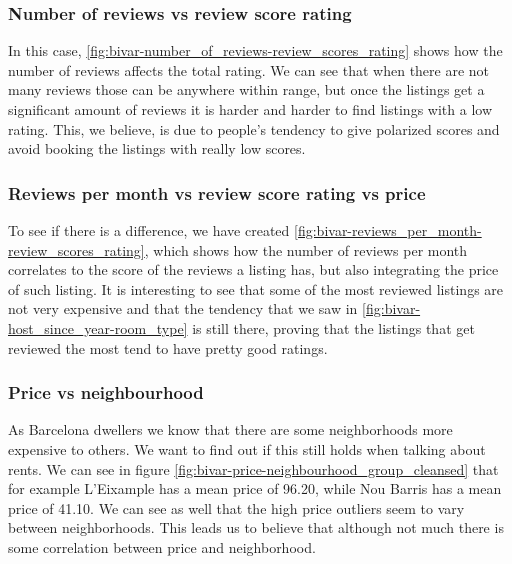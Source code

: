 \pagebreak
\subsubsection{Number of reviews vs review score rating}


 In this case, \cref{fig:bivar-number_of_reviews-review_scores_rating} shows how
 the number of reviews affects the total rating. We can see that when there are
 not many reviews those can be anywhere within range, but once the listings get
 a significant amount of reviews it is harder and harder to find listings with a
 low rating. This, we believe, is due to people's tendency to give polarized
 scores and avoid booking the listings with really low scores.

\pagebreak
\subsubsection{Reviews per month vs review score rating vs price}


 To see if there is a difference, we have created
 \cref{fig:bivar-reviews_per_month-review_scores_rating}, which shows how the
 number of reviews per month correlates to the score of the reviews a listing
 has, but also integrating the price of such listing. It is interesting to see
 that some of the most reviewed listings are not very expensive and that the
 tendency that we saw in \cref{fig:bivar-host_since_year-room_type} is still
 there, proving that the listings that get reviewed the most tend to have pretty
 good ratings.

\pagebreak

\subsubsection{Price vs neighbourhood}


As Barcelona dwellers we know that there are some neighborhoods more expensive
to others. We want to find out if this still holds when talking about \airbnb
rents.  We can see in figure \cref{fig:bivar-price-neighbourhood_group_cleansed}
that for example L'Eixample has a mean price of 96.20, %
while Nou Barris has a mean price of 41.10.  %
We can see as well that the high price outliers seem to vary between
neighborhoods. This leads us to believe that although not much there is some
correlation between price and neighborhood.

